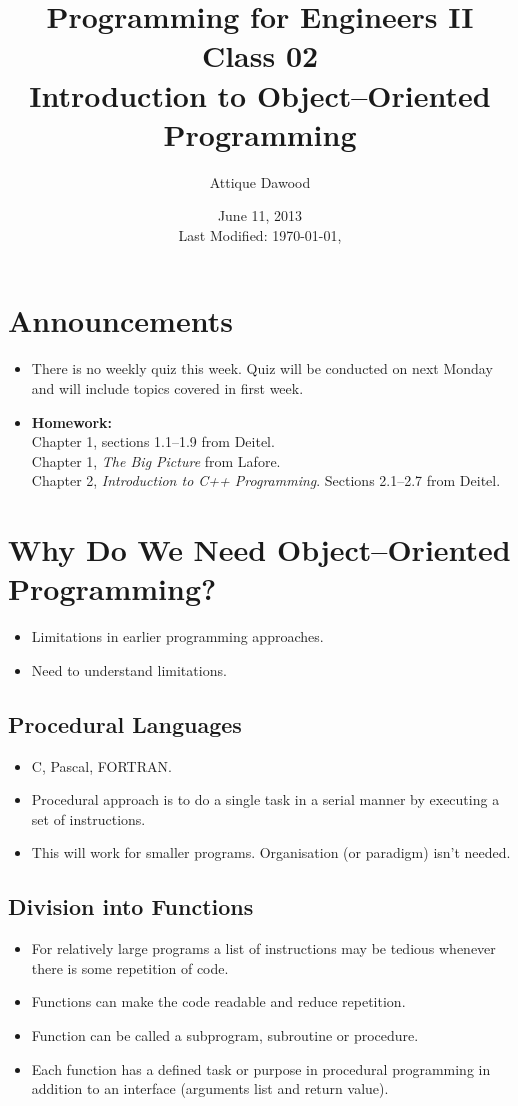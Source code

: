 \documentclass[12pt,a4paper]{article}
\title{\vspace{-2cm}Programming for Engineers II\\Class 02\\Introduction to Object--Oriented Programming}
\author{Attique Dawood}
\date{June 11, 2013\\[0.2cm] Last Modified: \today, \currenttime}
\begin{document}
\maketitle
\section{Announcements}
\begin{itemize}
\item There is no weekly quiz this week. Quiz will be conducted on next Monday and will include topics covered in first week.
\item \textbf{Homework:}\\
Chapter 1, sections 1.1--1.9 from Deitel.\\
Chapter 1, \textit{The Big Picture} from Lafore.\\
Chapter 2, \textit{Introduction to C++ Programming}. Sections 2.1--2.7 from Deitel.
\end{itemize}
\section{Why Do We Need Object--Oriented Programming?\cite{Lafore}}
\begin{itemize}
\item Limitations in earlier programming approaches.
\item Need to understand limitations.
\end{itemize}
\subsection{Procedural Languages}
\begin{itemize}
\item C, Pascal, FORTRAN.
\item Procedural approach is to do a single task in a serial manner by executing a set of instructions.
\item This will work for smaller programs. Organisation (or paradigm) isn't needed.
\end{itemize}
\subsection{Division into Functions}
\begin{itemize}
\item For relatively large programs a list of instructions may be tedious whenever there is some repetition of code.
\item Functions can make the code readable and reduce repetition.
\item Function can be called a subprogram, subroutine or procedure.
\item Each function has a defined task or purpose in procedural programming in addition to an interface (arguments list and return value).
\end{itemize}
\end{document}
